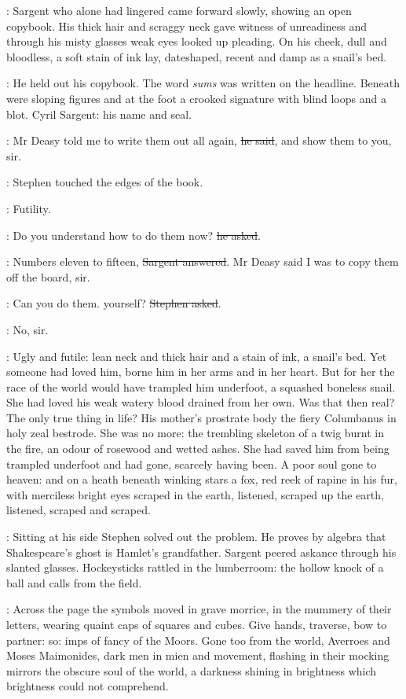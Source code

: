 :
Sargent who alone had lingered
came forward slowly, showing an open copybook.
His thick hair and scraggy neck gave witness of unreadiness
and through his misty glasses weak eyes looked up pleading.
On his cheek, dull and bloodless,
a soft stain of ink lay, dateshaped,
recent and damp as a snail's bed.

:
He held out his copybook.
The word \emph{sums} was written on the headline.
Beneath were sloping figures
and at the foot a crooked signature with blind loops and a blot.
Cyril Sargent: his name and seal.

\sargent:
Mr Deasy told me to write them out all again, \sout{he said},
and show them to you, sir.

:
Stephen touched the edges of the book.

\StephenInt:
Futility.

\Stephen:
Do you understand how to do them now?
\sout{he asked}.

\sargent:
Numbers eleven to fifteen,
\sout{Sargent answered}.
Mr Deasy said I was to copy them off the board, sir.

\Stephen:
Can you do them. yourself?
\sout{Stephen asked}.

\sargent:
No, sir.

\StephenInt:
Ugly and futile:
lean neck and thick hair
and a stain of ink, a snail's bed.
Yet someone had loved him, borne him in her arms and in her heart.
But for her the race of the world would have trampled him underfoot,
a squashed boneless snail.
She had loved his weak watery blood drained from her own.
Was that then real?
The only true thing in life?
His mother's prostrate body
the fiery Columbanus in holy zeal bestrode.
She was no more:
the trembling skeleton of a twig burnt in the fire,
an odour of rosewood and wetted ashes.
She had saved him from being trampled underfoot
and had gone, scarcely having been.
A poor soul gone to heaven:
and on a heath beneath winking stars
a fox, red reek of rapine in his fur,
with merciless bright eyes scraped in the earth,
listened, scraped up the earth,
listened, scraped and scraped.

:
Sitting at his side Stephen solved out the problem.
He proves by algebra that Shakespeare's ghost is Hamlet's grandfather.
Sargent peered askance through his slanted glasses.
Hockeysticks rattled in the lumberroom:
the hollow knock of a ball and calls from the field.

\StephenInt:
Across the page the symbols moved in grave morrice,
in the mummery of their letters,
wearing quaint caps of squares and cubes.
Give hands, traverse, bow to partner:
so:
imps of fancy of the Moors.
Gone too from the world,
Averroes and Moses Maimonides,
dark men in mien and movement,
flashing in their mocking mirrors the obscure soul of the world,
a darkness shining in brightness which brightness could not comprehend.


